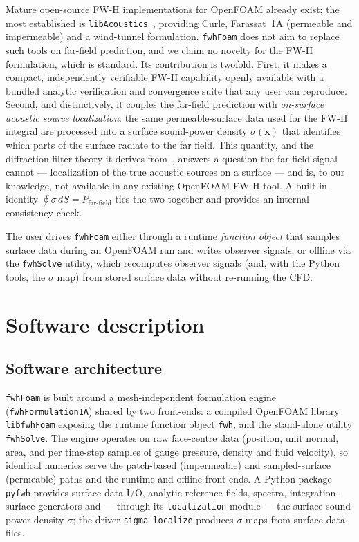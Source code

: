\documentclass[preprint,12pt,a4paper]{elsarticle}
\begin{document}
Mature open-source FW-H implementations for OpenFOAM already exist; the most
established is \texttt{libAcoustics}~\cite{epikhin2015}, providing Curle,
Farassat~1A (permeable and impermeable) and a wind-tunnel formulation.
\texttt{fwhFoam} does not aim to replace such tools on far-field prediction,
and we claim no novelty for the FW-H formulation, which is standard. Its
contribution is twofold. First, it makes a compact, independently verifiable
FW-H capability openly available with a bundled analytic verification and
convergence suite that any user can reproduce. Second, and distinctively, it
couples the far-field prediction with \emph{on-surface acoustic source
localization}: the same permeable-surface data used for the FW-H integral
are processed into a surface sound-power density $\sigma(\mathbf{x})$ that
identifies which parts of the surface radiate to the far field. This
quantity, and the diffraction-filter theory it derives from~\cite{delfs2024,
sharma_spectral,sharma_porous}, answers a question the far-field signal
cannot --- localization of the true acoustic sources on a surface --- and is,
to our knowledge, not available in any existing OpenFOAM FW-H tool. A
built-in identity $\oint\sigma\,dS = P_\mathrm{far\text{-}field}$ ties the two
together and provides an internal consistency check.

The user drives \texttt{fwhFoam} either through a runtime \emph{function
object} that samples surface data during an OpenFOAM run and writes observer
signals, or offline via the \texttt{fwhSolve} utility, which recomputes
observer signals (and, with the Python tools, the $\sigma$ map) from stored
surface data without re-running the CFD.

\section{Software description}
\label{sec:description}

\subsection{Software architecture}

\texttt{fwhFoam} is built around a mesh-independent formulation engine
(\texttt{fwhFormulation1A}) shared by two front-ends: a compiled OpenFOAM
library \texttt{libfwhFoam} exposing the runtime function object
\texttt{fwh}, and the stand-alone utility \texttt{fwhSolve}. The engine
operates on raw face-centre data (position, unit normal, area, and per
time-step samples of gauge pressure, density and fluid velocity), so
identical numerics serve the patch-based (impermeable) and sampled-surface
(permeable) paths and the runtime and offline front-ends. A Python package
\texttt{pyfwh} provides surface-data I/O, analytic reference fields, spectra,
integration-surface generators and --- through its \texttt{localization}
module --- the surface sound-power density $\sigma$; the driver
\texttt{sigma\_localize} produces $\sigma$ maps from surface-data files.
\end{document}
